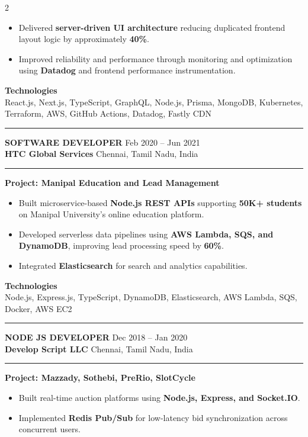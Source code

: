 \documentclass[10pt,a4paper]{article}
\newcommand{\blockdivider}{\vspace{0pt}\color{rulecolor}\rule{\linewidth}{0.5pt}\color{primary}\vspace{4pt}}
\newcommand{\roleheader}[4]{%
  \noindent
  \textbf{\MakeUppercase{#3}}%
  \hfill
  \textcolor{secondary}{#4}\\[0pt]

  \noindent
  \textbf{#1}%
  \hfill
  \textcolor{secondary}{#2}\\[0pt]
}
\newcommand{\roledivider}{%
  \vspace{-1pt}%
  {\color{rulecolor}\rule{\linewidth}{0.5pt}}%
  \vspace{2pt}%
}
\newcommand{\projecttitle}[1]{\textbf{#1}\par\vspace{2pt}}
\begin{document}
\begin{paracol}{2}
\begin{itemize}
\item Delivered \textbf{server-driven UI architecture} reducing duplicated frontend layout logic by approximately \textbf{40\%}.

\item Improved reliability and performance through monitoring and optimization using \textbf{Datadog} and frontend performance instrumentation.

\end{itemize}

\textbf{Technologies}\\
React.js, Next.js, TypeScript, GraphQL, Node.js, Prisma, MongoDB, Kubernetes, Terraform, AWS, GitHub Actions, Datadog, Fastly CDN

\blockdivider

\roleheader{HTC Global Services}{Chennai, Tamil Nadu, India}{Software Developer}{Feb 2020 -- Jun 2021}
\roledivider

\projecttitle{Project: Manipal Education and Lead Management}
\begin{itemize}

\item Built microservice-based \textbf{Node.js REST APIs} supporting \textbf{50K+ students} on Manipal University's online education platform.

\item Developed serverless data pipelines using \textbf{AWS Lambda, SQS, and DynamoDB}, improving lead processing speed by \textbf{60\%}.

\item Integrated \textbf{Elasticsearch} for search and analytics capabilities.

\end{itemize}

\textbf{Technologies}\\
Node.js, Express.js, TypeScript, DynamoDB, Elasticsearch, AWS Lambda, SQS, Docker, AWS EC2

\blockdivider

\roleheader{Develop Script LLC}{Chennai, Tamil Nadu, India}{Node JS Developer}{Dec 2018 -- Jan 2020}
\roledivider

\projecttitle{Project: Mazzady, Sothebi, PreRio, SlotCycle}
\begin{itemize}

\item Built real-time auction platforms using \textbf{Node.js, Express, and Socket.IO}.

\item Implemented \textbf{Redis Pub/Sub} for low-latency bid synchronization across concurrent users.


\end{itemize}
\end{paracol}
\end{document}
